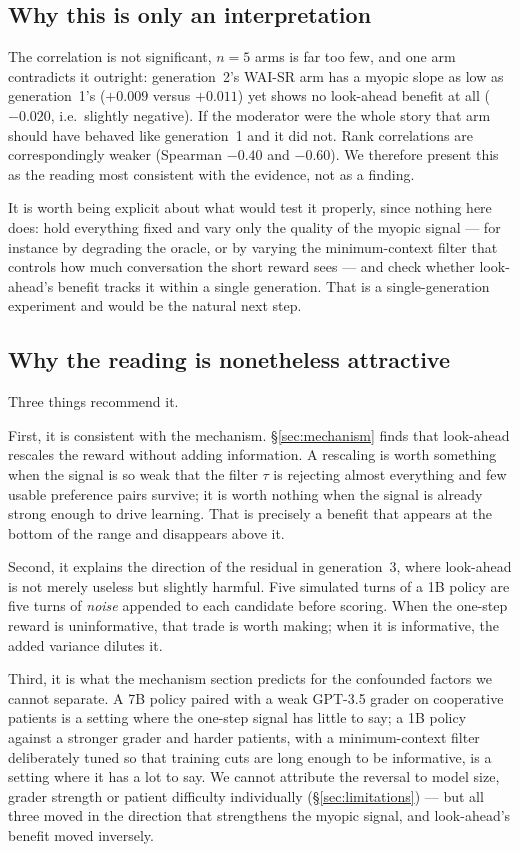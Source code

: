\subsection{Why this is only an interpretation}
The correlation is not significant, $n = 5$ arms is far too few, and one arm contradicts it
outright: generation~2's WAI-SR arm has a myopic slope as low as generation~1's ($+0.009$
versus $+0.011$) yet shows no look-ahead benefit at all ($-0.020$, i.e.\ slightly negative). If
the moderator were the whole story that arm should have behaved like generation~1 and it did
not. Rank correlations are correspondingly weaker (Spearman $-0.40$ and $-0.60$). We therefore
present this as the reading most consistent with the evidence, not as a finding.

It is worth being explicit about what would test it properly, since nothing here does: hold
everything fixed and vary only the quality of the myopic signal --- for instance by degrading
the oracle, or by varying the minimum-context filter that controls how much conversation the
short reward sees --- and check whether look-ahead's benefit tracks it within a single
generation. That is a single-generation experiment and would be the natural next step.

\subsection{Why the reading is nonetheless attractive}
Three things recommend it.

First, it is consistent with the mechanism. \S\ref{sec:mechanism} finds that look-ahead
rescales the reward without adding information. A rescaling is worth something when the signal
is so weak that the filter $\tau$ is rejecting almost everything and few usable preference
pairs survive; it is worth nothing when the signal is already strong enough to drive learning.
That is precisely a benefit that appears at the bottom of the range and disappears above it.

Second, it explains the direction of the residual in generation~3, where look-ahead is not
merely useless but slightly harmful. Five simulated turns of a 1B policy are five turns of
\emph{noise} appended to each candidate before scoring. When the one-step reward is
uninformative, that trade is worth making; when it is informative, the added variance dilutes
it.

Third, it is what the mechanism section predicts for the confounded factors we cannot separate.
A 7B policy paired with a weak GPT-3.5 grader on cooperative patients is a setting where the
one-step signal has little to say; a 1B policy against a stronger grader and harder patients,
with a minimum-context filter deliberately tuned so that training cuts are long enough to be
informative, is a setting where it has a lot to say. We cannot attribute the reversal to model
size, grader strength or patient difficulty individually (\S\ref{sec:limitations}) --- but all
three moved in the direction that strengthens the myopic signal, and look-ahead's benefit moved
inversely.

